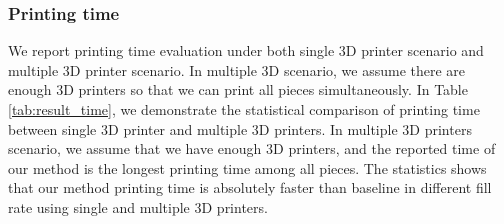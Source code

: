 \subsubsection{Printing time}
We report printing time evaluation under both single 3D printer scenario and multiple 3D printer scenario.
In multiple 3D scenario, we assume there are enough 3D printers so that we can print all pieces simultaneously.
In Table \ref{tab:result_time}, we demonstrate the statistical comparison of printing time between single 3{D} printer and multiple 3{D} printers. 
In multiple 3{D} printers scenario, we assume that we have enough 3{D} printers, and the reported time of our method is the longest printing time among all pieces.
The statistics shows that our method printing time is absolutely faster than baseline in different fill rate using single and multiple 3{D} printers. 
